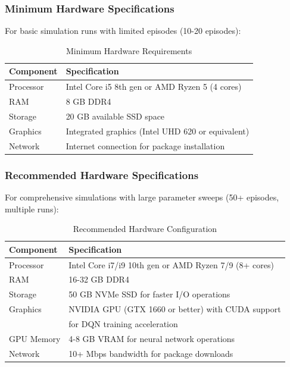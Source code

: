 \documentclass[12pt,a4paper]{article}
\begin{document}
\subsubsection{Minimum Hardware Specifications}

For basic simulation runs with limited episodes (10-20 episodes):

\begin{table}[htbp]
\centering
\caption{Minimum Hardware Requirements}
\label{tab:min_hardware}
\begin{tabular}{|l|l|}
\hline
\textbf{Component} & \textbf{Specification} \\
\hline
Processor & Intel Core i5 8th gen or AMD Ryzen 5 (4 cores) \\
\hline
RAM & 8 GB DDR4 \\
\hline
Storage & 20 GB available SSD space \\
\hline
Graphics & Integrated graphics (Intel UHD 620 or equivalent) \\
\hline
Network & Internet connection for package installation \\
\hline
\end{tabular}
\end{table}

\subsubsection{Recommended Hardware Specifications}

For comprehensive simulations with large parameter sweeps (50+ episodes, multiple runs):

\begin{table}[htbp]
\centering
\caption{Recommended Hardware Configuration}
\label{tab:rec_hardware}
\begin{tabular}{|l|l|}
\hline
\textbf{Component} & \textbf{Specification} \\
\hline
Processor & Intel Core i7/i9 10th gen or AMD Ryzen 7/9 (8+ cores) \\
\hline
RAM & 16-32 GB DDR4 \\
\hline
Storage & 50 GB NVMe SSD for faster I/O operations \\
\hline
Graphics & NVIDIA GPU (GTX 1660 or better) with CUDA support \\
& for DQN training acceleration \\
\hline
GPU Memory & 4-8 GB VRAM for neural network operations \\
\hline
Network & 10+ Mbps bandwidth for package downloads \\
\hline
\end{tabular}
\end{table}
\end{document}
